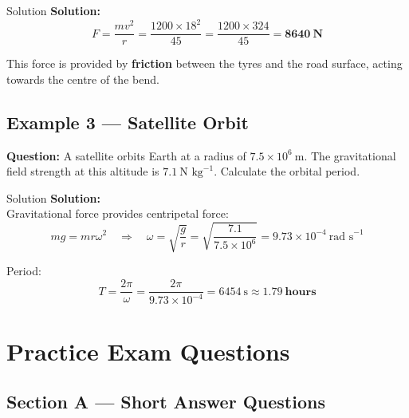 \begin{examplebox}{Solution}
\textbf{Solution:}\\
$$F = \frac{mv^2}{r} = \frac{1200 \times 18^2}{45} = \frac{1200 \times 324}{45} = \mathbf{8640\ \text{N}}$$

This force is provided by \textbf{friction} between the tyres and the road surface, acting towards the centre of the bend.
\end{examplebox}

\subsection*{Example 3 — Satellite Orbit}

\textbf{Question:} A satellite orbits Earth at a radius of $7.5\times10^6\ \text{m}$. The gravitational field strength at this altitude is $7.1\ \text{N kg}^{-1}$. Calculate the orbital period.

\begin{examplebox}{Solution}
\textbf{Solution:}\\
Gravitational force provides centripetal force:
$$mg = mr\omega^2 \quad \Rightarrow \quad \omega = \sqrt{\frac{g}{r}} = \sqrt{\frac{7.1}{7.5\times10^6}} = 9.73\times10^{-4}\ \text{rad s}^{-1}$$

Period:
$$T = \frac{2\pi}{\omega} = \frac{2\pi}{9.73\times10^{-4}} = 6454\ \text{s} \approx \mathbf{1.79\ \text{hours}}$$
\end{examplebox}

\pagebreak

\section{Practice Exam Questions}

\subsection*{Section A — Short Answer Questions}

